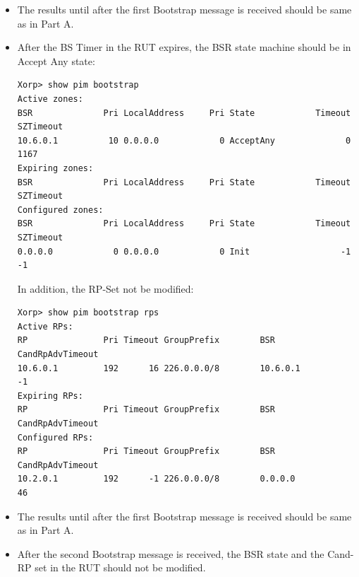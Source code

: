 \documentclass[11pt]{report}
\begin{document}
\begin{itemize}

  \item The results until after the first Bootstrap message is received should
  be same as in Part A.

  \item After the BS Timer in the RUT expires, the BSR state machine should be
  in Accept Any state:

\begin{verbatim}
Xorp> show pim bootstrap
Active zones:
BSR              Pri LocalAddress     Pri State            Timeout SZTimeout
10.6.0.1          10 0.0.0.0            0 AcceptAny              0      1167
Expiring zones:
BSR              Pri LocalAddress     Pri State            Timeout SZTimeout
Configured zones:
BSR              Pri LocalAddress     Pri State            Timeout SZTimeout
0.0.0.0            0 0.0.0.0            0 Init                  -1        -1
\end{verbatim}

  In addition, the RP-Set not be modified:

\begin{verbatim}
Xorp> show pim bootstrap rps 
Active RPs:
RP               Pri Timeout GroupPrefix        BSR         CandRpAdvTimeout
10.6.0.1         192      16 226.0.0.0/8        10.6.0.1                  -1
Expiring RPs:
RP               Pri Timeout GroupPrefix        BSR         CandRpAdvTimeout
Configured RPs:
RP               Pri Timeout GroupPrefix        BSR         CandRpAdvTimeout
10.2.0.1         192      -1 226.0.0.0/8        0.0.0.0                   46
\end{verbatim}

\end{itemize}


\begin{itemize}

  \item The results until after the first Bootstrap message is received should
  be same as in Part A.

  \item After the second Bootstrap message is received, the BSR state and the
  Cand-RP set in the RUT should not be modified.

\end{itemize}

\end{document}
